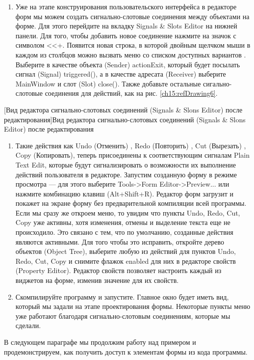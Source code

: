 \begin{enumerate}
\item Уже на этапе конструирования пользовательского интерфейса в редакторе форм мы можем создать сигнально-слотовые
соединения между объектами на форме. Для этого перейдите на вкладку Signals \& Slots Editor на нижней панели. Для того,
чтобы добавить новое соединение нажмите на значок с символом <<+. Появится новая строка, в которой
двойным щелчком мыши в каждом из столбцов можно вызвать меню со списком доступных вариантов . Выберите в качестве
объекта (Sender) actionExit, который будет посылать сигнал (Signal) triggered(), а в качестве адресата (Receiver)
выберите MainWindow и слот (Slot) close(). Также добавьте остальные сигально- слотовые соединения для действий, как на
рис. \ref{ch15:refDrawing6}.

\end{enumerate}
{%
[Вид редактора сигнально{}-слотовых соединений (Signals \& Slons Editor) после редактирования]{Вид
редактора сигнально-слотовых соединений (Signals \& Slons Editor) после редактирования}
\label{ch15:refDrawing6}
\par}

\begin{enumerate}
\item Такие действия как Undo (Отменить) , Redo (Повторить) , Cut (Вырезать) , Copy (Копировать), теперь присоединены к
соответствующим сигналам Plain Text Edit, которые будут сигнализировать о возможности их выполнение действий
пользователя в редакторе. Запустим созданную форму в режиме просмотра --- для этого выберите Tools-{>}Form
Editor-{>}Preview... или нажмите комбинацию клавиш (Alt+Shift+R). Редактор форм загрузит и покажет на экране
форму без предварительной компиляции всей программы. Если мы сразу же откроем меню, то увидим что пункты Undo, Redo,
Cut, Copy уже активны, хотя изменения, отмены и выделение текста еще не происходило. Это связано с тем, что по
умолчанию, созданные действия являются активными. Для того чтобы это исправить, откройте дерево объектов (Object Tree),
выберите любую из действий для пунктов Undo, Redo, Cut, Copy и снимите флажок enabled для них в редакторе свойств
(Property Editor). Редактор свойств позволяет настроить каждый из виджетов на форме, изменив значение для их свойств. 
\item Скомпилируйте программу и запустите. Главное окно будет иметь вид, который мы задали на этапе проектирования
формы. Некоторые пункты меню уже работают благодаря сигнально-слотовым соединениям, которые мы сделали.
\end{enumerate}
В следующем параграфе мы продолжим работу над примером и продемонстрируем, как получить доступ к элементам формы из кода
программы.

